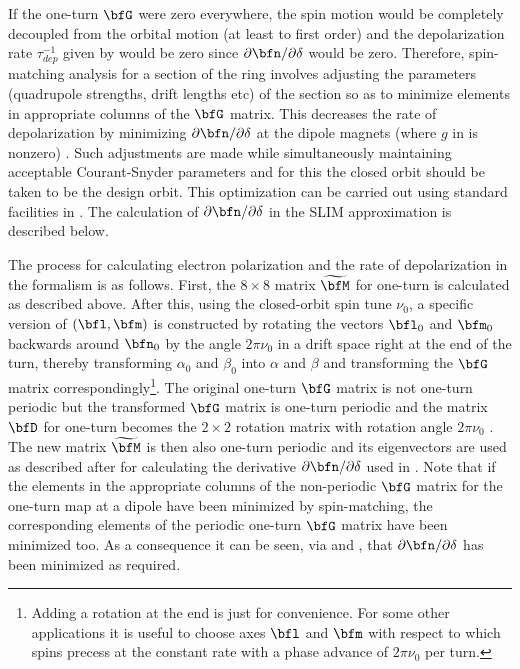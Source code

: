 {If the one-turn $\bfG$ were zero everywhere, the spin motion would be completely decoupled from the
orbital motion (at least to first order) and the depolarization rate $\tau_{dep}^{-1}$ given by
 would be zero since $\partial\bfn / \partial\delta$ would be zero. Therefore,
spin-matching analysis for a section of the ring involves adjusting the parameters (quadrupole
strengths, drift lengths etc) of the section so as to minimize elements in appropriate columns of
the $\bfG$ matrix. This decreases the rate of depolarization by minimizing
$\partial\bfn/\partial\delta$ at the dipole magnets (where $g$ in  is nonzero)
\cite{b:barber99}. Such adjustments are made while simultaneously maintaining acceptable
Courant-Snyder parameters and for this the closed orbit should be taken to be the design orbit.
This optimization can be carried out using standard facilities in \bmad. The calculation of
$\partial\bfn/\partial\delta$ in the SLIM approximation is described below.

The process for calculating electron polarization and the rate of depolarization in the 
formalism is as follows. First, the $8 \times 8$ matrix $\widetilde\bfM$ for one-turn is calculated
as described above. After this, using the closed-orbit spin tune $\nu_0$, a specific version of
$(\bfl, \bfm)$ is constructed by rotating the vectors $\bfl_0$ and $\bfm_0$ backwards around
$\bfn_0$ by the angle $2\pi \nu_0$ in a drift space right at the end of the turn, thereby
transforming $\alpha_0$ and $\beta_0$ into $\alpha$ and $\beta$ and transforming the $\bfG$ matrix
correspondingly\footnote{Adding a rotation at the end is just for convenience. For some other
applications it is useful to choose axes $\bfl$ and $\bfm$ with respect to which spins precess at
the constant rate with a phase advance of $2\pi \nu_0$ per turn.}. The original one-turn $\bfG$
matrix is not one-turn periodic but the transformed $\bfG$ matrix is one-turn periodic and the
matrix $\bfD$ for one-turn becomes the $2 \times 2$ rotation matrix with rotation angle $2\pi \nu_0$
\cite{b:chao.spin}. The new matrix $\widetilde \bfM$ is then also one-turn periodic and its
eigenvectors are used as described after  for calculating the derivative ${\partial
\bfn}/\partial \delta$ used in . Note that if the elements in the appropriate columns of
the non-periodic $\bfG$ matrix for the one-turn map at a dipole have been minimized by
spin-matching, the corresponding elements of the periodic one-turn $\bfG$ matrix have been minimized
too. As a consequence it can be seen, via  and , that
$\partial\bfn/\partial\delta$ has been minimized as required.

}

